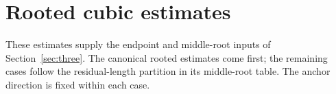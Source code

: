 \section{Rooted cubic estimates}\label{q3:app:roots}
These estimates supply the endpoint and middle-root inputs of
Section~\ref{sec:three}. The canonical rooted estimates come first;
the remaining cases follow the residual-length partition in its
middle-root table. The anchor direction is fixed within each case.







